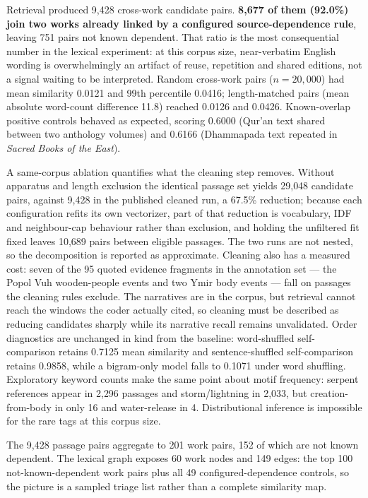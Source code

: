 \documentclass[11pt]{article}
\DeclareRobustCommand{\_}{\textunderscore\allowbreak}
\begin{document}
Retrieval produced 9{,}428 cross-work candidate pairs. \textbf{8{,}677 of them
(92.0\%) join two works already linked by a configured source-dependence rule},
leaving 751 pairs not known dependent. That ratio is the most consequential
number in the lexical experiment: at this corpus size, near-verbatim English
wording is overwhelmingly an artifact of reuse, repetition and shared editions,
not a signal waiting to be interpreted. Random cross-work pairs (\(n = 20{,}000\))
had mean similarity 0.0121 and 99th percentile 0.0416; length-matched pairs (mean
absolute word-count difference 11.8) reached 0.0126 and 0.0426. Known-overlap
positive controls behaved as expected, scoring 0.6000 (Qur'an text shared between
two anthology volumes) and 0.6166 (Dhammapada text repeated in \emph{Sacred Books
of the East}).

A same-corpus ablation quantifies what the cleaning step removes. Without
apparatus and length exclusion the identical passage set yields 29{,}048 candidate
pairs, against 9{,}428 in the published cleaned run, a 67.5\% reduction; because
each configuration refits its own vectorizer, part of that reduction is
vocabulary, IDF and neighbour-cap behaviour rather than exclusion, and holding
the unfiltered fit fixed leaves 10{,}689 pairs between eligible passages. The two
runs are not nested, so the decomposition is reported as approximate. Cleaning
also has a measured cost: seven of the 95 quoted evidence fragments in the
annotation set --- the Popol Vuh wooden-people events and two Ymir body events ---
fall on passages the cleaning rules exclude. The narratives are in the corpus,
but retrieval cannot reach the windows the coder actually cited, so cleaning must
be described as reducing candidates sharply while its narrative recall remains
unvalidated. Order diagnostics are unchanged in kind from the baseline:
word-shuffled self-comparison retains 0.7125 mean similarity and
sentence-shuffled self-comparison retains 0.9858, while a bigram-only model falls
to 0.1071 under word shuffling. Exploratory keyword counts make the same point
about motif frequency: serpent references appear in 2{,}296 passages and
storm/lightning in 2{,}033, but creation-from-body in only 16 and water-release in
4. Distributional inference is impossible for the rare tags at this corpus size.

The 9{,}428 passage pairs aggregate to 201 work pairs, 152 of which are not known
dependent. The lexical graph exposes 60 work nodes and 149 edges: the top 100
not-known-dependent work pairs plus all 49 configured-dependence controls, so the
picture is a sampled triage list rather than a complete similarity map.
\end{document}
